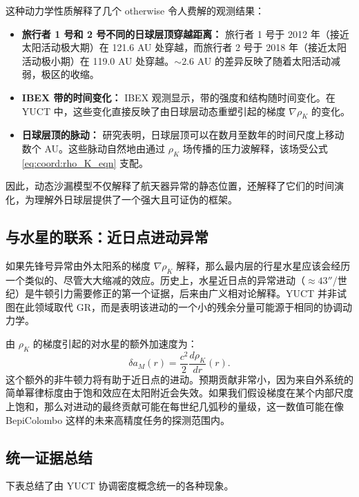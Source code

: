 \documentclass[11pt,a4paper]{article}
\theoremstyle{remark}
\begin{document}
	这种动力学性质解释了几个 otherwise 令人费解的观测结果：
	\begin{itemize}
		\item \textbf{旅行者 1 号和 2 号不同的日球层顶穿越距离：} 旅行者 1 号于 2012 年（接近太阳活动极大期）在 121.6 AU 处穿越，而旅行者 2 号于 2018 年（接近太阳活动极小期）在 119.0 AU 处穿越。$\sim2.6$ AU 的差异反映了随着太阳活动减弱，极区的收缩。
		
		\item \textbf{IBEX 带的时间变化：} IBEX 观测显示，带的强度和结构随时间变化。在 YUCT 中，这些变化直接反映了由日球层动态重塑引起的梯度 $\nabla \rho_K$ 的变化。
		
		\item \textbf{日球层顶的脉动：} 研究表明，日球层顶可以在数月至数年的时间尺度上移动数个 AU。这些脉动自然地由通过 $\rho_K$ 场传播的压力波解释，该场受公式 \eqref{eq:coord:rho_K_eqn} 支配。
	\end{itemize}
	
	因此，动态沙漏模型不仅解释了航天器异常的静态位置，还解释了它们的时间演化，为理解外日球层提供了一个强大且可证伪的框架。
	
	\subsection{与水星的联系：近日点进动异常}
	\label{subsec:coord:mercury}
	
	如果先锋号异常由外太阳系的梯度 $\nabla \rho_K$ 解释，那么最内层的行星水星应该会经历一个类似的、尽管大大缩减的效应。历史上，水星近日点的异常进动（$\approx 43''$/世纪）是牛顿引力需要修正的第一个证据，后来由广义相对论解释。YUCT 并非试图在此领域取代 GR，而是表明该进动的一个小的残余分量可能源于相同的协调动力学。
	
	由 $\rho_K$ 的梯度引起的对水星的额外加速度为：
	\begin{equation}
		\delta a_M(r) = \frac{c^2}{2} \frac{d\rho_K}{dr}(r).
	\end{equation}
	这个额外的非牛顿力将有助于近日点的进动。预期贡献非常小，因为来自外系统的简单幂律标度由于饱和效应在太阳附近会失效。如果我们假设梯度在某个内部尺度上饱和，那么对进动的最终贡献可能在每世纪几弧秒的量级，这一数值可能在像 BepiColombo 这样的未来高精度任务的探测范围内。
	
	\subsection{统一证据总结}
	
	下表总结了由 YUCT 协调密度概念统一的各种现象。
	
\end{document}

